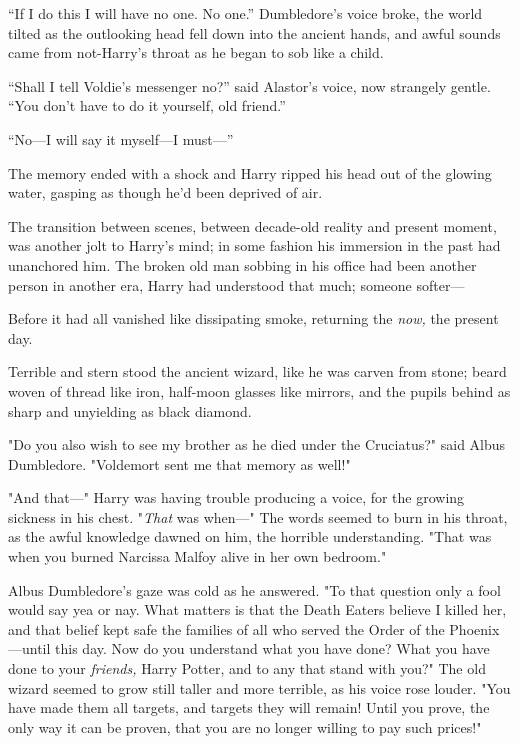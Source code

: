 \begin{em}
``If I do this I will have no one. No one.'' Dumbledore's voice broke, the
world tilted as the outlooking head fell down into the ancient hands, and awful
sounds came from not-Harry's throat as he began to sob like a child.

``Shall I tell Voldie's messenger no?'' said Alastor's voice, now strangely
gentle. ``You don't have to do it yourself, old friend.''

``No—I will say it myself—I must—''
\end{em}
\sbreak
The memory ended with a shock and Harry ripped his head out of the glowing
water, gasping as though he'd been deprived of air.

The transition between scenes, between decade-old reality and present moment,
was another jolt to Harry's mind; in some fashion his immersion in the past had
unanchored him. The broken old man sobbing in his office had been another
person in another era, Harry had understood that much; someone softer—

Before it had all vanished like dissipating smoke, returning the \emph{now,}
the present day.

Terrible and stern stood the ancient wizard, like he was carven from stone;
beard woven of thread like iron, half-moon glasses like mirrors, and the pupils
behind as sharp and unyielding as black diamond.

"Do you also wish to see my brother as he died under the Cruciatus?" said Albus
Dumbledore. "Voldemort sent me that memory as well!"

"And that—" Harry was having trouble producing a voice, for the growing
sickness in his chest. "\emph{That} was when—" The words seemed to burn in
his throat, as the awful knowledge dawned on him, the horrible understanding.
"That was when you burned Narcissa Malfoy alive in her own bedroom."

Albus Dumbledore's gaze was cold as he answered. "To that question only a fool
would say yea or nay. What matters is that the Death Eaters believe I killed
her, and that belief kept safe the families of all who served the Order of the
Phoenix—until this day. Now do you understand what you have done? What you
have done to your \emph{friends,} Harry Potter, and to any that stand with
you?" The old wizard seemed to grow still taller and more terrible, as his
voice rose louder. "You have made them all targets, and targets they will
remain! Until you prove, the only way it can be proven, that you are no longer
willing to pay such prices!"

